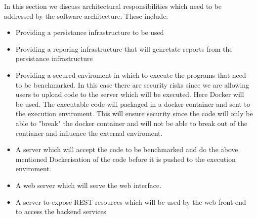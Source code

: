 In this section we discuss architectural responsibilities which need to be addressed by the software
architecture. These include:\\
\begin{itemize}
	\item Providing a persistance infrastructure to be used
	\item Providing a reporing infrastructure that will genretate reports from the persistance infrastructure
	\item Providing a secured enviroment in which to execute the programs that need to be benchmarked.
	In this case there are security risks since we are allowing users to upload code to the server which
	will be executed. Here Docker will be used. The executable code will packaged in a docker container
	and sent to the execution enviroment. This will ensure security since the code will only be able to
	"break" the docker container and will not be able to break out of the contianer and influence the external
	enviroment.
	\item A server which will accept the code to be benchmarked and do the above mentioned Dockerisation of the code
	before it is pushed to the execution enviroment.
	\item A web server which will serve the web interface.
	\item A server to expose REST resources which will be used by the web front end to access the backend services
\end{itemize}
